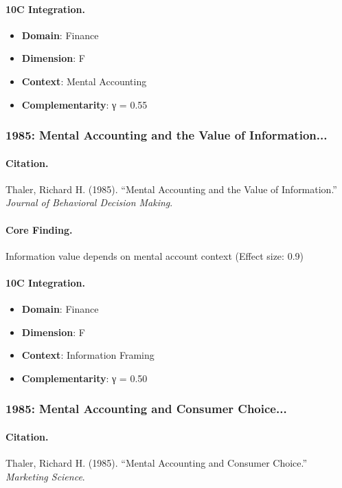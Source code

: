\paragraph{10C Integration.}
\begin{itemize}[nosep]
  \item \textbf{Domain}: Finance
  \item \textbf{Dimension}: F
  \item \textbf{Context}: Mental Accounting
  \item \textbf{Complementarity}: γ = 0.55
\end{itemize}

\subsubsection{1985: Mental Accounting and the Value of Information...}

\paragraph{Citation.}
Thaler, Richard H. (1985). ``Mental Accounting and the Value of Information.''
\textit{Journal of Behavioral Decision Making}.

\paragraph{Core Finding.}
Information value depends on mental account context (Effect size: 0.9)

\paragraph{10C Integration.}
\begin{itemize}[nosep]
  \item \textbf{Domain}: Finance
  \item \textbf{Dimension}: F
  \item \textbf{Context}: Information Framing
  \item \textbf{Complementarity}: γ = 0.50
\end{itemize}

\subsubsection{1985: Mental Accounting and Consumer Choice...}

\paragraph{Citation.}
Thaler, Richard H. (1985). ``Mental Accounting and Consumer Choice.''
\textit{Marketing Science}.

